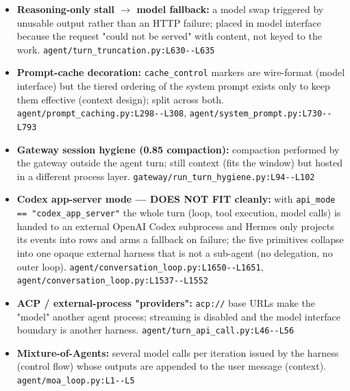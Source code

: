 \begin{itemize}
\item \textbf{Reasoning-only stall $\rightarrow$ model fallback:} a model swap triggered by unusable output rather than an HTTP failure; placed in model interface because the request "could not be served" with content, not keyed to the work. \texttt{agent/\allowbreak{}turn\_\allowbreak{}truncation.\allowbreak{}py:\allowbreak{}L630-\allowbreak{}-\allowbreak{}L635}
\item \textbf{Prompt-cache decoration:} \texttt{cache\_\allowbreak{}control} markers are wire-format (model interface) but the tiered ordering of the system prompt exists only to keep them effective (context design); split across both. \texttt{agent/\allowbreak{}prompt\_\allowbreak{}caching.\allowbreak{}py:\allowbreak{}L298-\allowbreak{}-\allowbreak{}L308}, \texttt{agent/\allowbreak{}system\_\allowbreak{}prompt.\allowbreak{}py:\allowbreak{}L730-\allowbreak{}-\allowbreak{}L793}
\item \textbf{Gateway session hygiene (0.85 compaction):} compaction performed by the gateway outside the agent turn; still context (fits the window) but hosted in a different process layer. \texttt{gateway/\allowbreak{}run\_\allowbreak{}turn\_\allowbreak{}hygiene.\allowbreak{}py:\allowbreak{}L94-\allowbreak{}-\allowbreak{}L102}
\item \textbf{Codex app-server mode --- DOES NOT FIT cleanly:} with \texttt{api\_\allowbreak{}mode == "codex\_\allowbreak{}app\_\allowbreak{}server"} the whole turn (loop, tool execution, model calls) is handed to an external OpenAI Codex subprocess and Hermes only projects its events into rows and arms a fallback on failure; the five primitives collapse into one opaque external harness that is not a sub-agent (no delegation, no outer loop). \texttt{agent/\allowbreak{}conversation\_\allowbreak{}loop.\allowbreak{}py:\allowbreak{}L1650-\allowbreak{}-\allowbreak{}L1651}, \texttt{agent/\allowbreak{}conversation\_\allowbreak{}loop.\allowbreak{}py:\allowbreak{}L1537-\allowbreak{}-\allowbreak{}L1552}
\item \textbf{ACP / external-process "providers":} \texttt{acp:\allowbreak{}/\allowbreak{}/\allowbreak{}} base URLs make the "model" another agent process; streaming is disabled and the model interface boundary is another harness. \texttt{agent/\allowbreak{}turn\_\allowbreak{}api\_\allowbreak{}call.\allowbreak{}py:\allowbreak{}L46-\allowbreak{}-\allowbreak{}L56}
\item \textbf{Mixture-of-Agents:} several model calls per iteration issued by the harness (control flow) whose outputs are appended to the user message (context). \texttt{agent/\allowbreak{}moa\_\allowbreak{}loop.\allowbreak{}py:\allowbreak{}L1-\allowbreak{}-\allowbreak{}L5}
\end{itemize}

